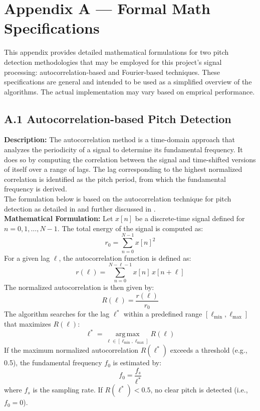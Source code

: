 \documentclass[12pt]{article}
\begin{document}
\newpage{}



\newpage{}
\section*{Appendix A --- Formal Math Specifications}
This appendix provides detailed mathematical formulations for two pitch detection 
methodologies that may be employed for this project's signal processing: autocorrelation-based and Fourier-based techniques. These specifications are general
and intended to be used as a simplified overview of the algorithms. The actual implementation may vary based on emprical performance.
\subsection*{A.1 Autocorrelation-based Pitch Detection}
\textbf{Description:} The autocorrelation method is a time-domain approach that analyzes the periodicity of a signal to determine 
its fundamental frequency. It does so by computing the correlation between the signal and time-shifted versions of itself over a 
range of lags. The lag corresponding to the highest normalized correlation is identified as the pitch period, from which the 
fundamental frequency is derived.\\
The formulation below is based on the autocorrelation technique for pitch detection as detailed in \cite{Rabiner-use} and further discussed in \cite{Rabiner-digital}.\\
\newline
\textbf{Mathematical Formulation:}  
Let \( x[n] \) be a discrete-time signal defined for \( n = 0, 1, \dots, N-1\). The total energy of the signal is computed as:
\[r_0 = \sum_{n=0}^{N-1} x[n]^2\]
For a given lag \( \ell \), the autocorrelation function is defined as:
\[r(\ell) = \sum_{n=0}^{N-\ell-1} x[n]\,x[n+\ell]\]
The normalized autocorrelation is then given by:
\[R(\ell) = \frac{r(\ell)}{r_0}\]
The algorithm searches for the lag \( \ell^* \) within a predefined range \([\ell_{\min}, \ell_{\max}]\) that maximizes \( R(\ell) \):
\[\ell^* = \operatorname*{arg\,max}_{\ell \in [\ell_{\min}, \ell_{\max}]} R(\ell)\]
If the maximum normalized autocorrelation \( R(\ell^*) \) exceeds a threshold (e.g., 0.5), the fundamental frequency \( f_0 \) is estimated by:
\[f_0 = \frac{f_s}{\ell^*}\]
where \( f_s \) is the sampling rate. If \( R(\ell^*) < 0.5 \), no clear pitch is detected (i.e., \( f_0 = 0 \)).\\
\newline
\end{document}
